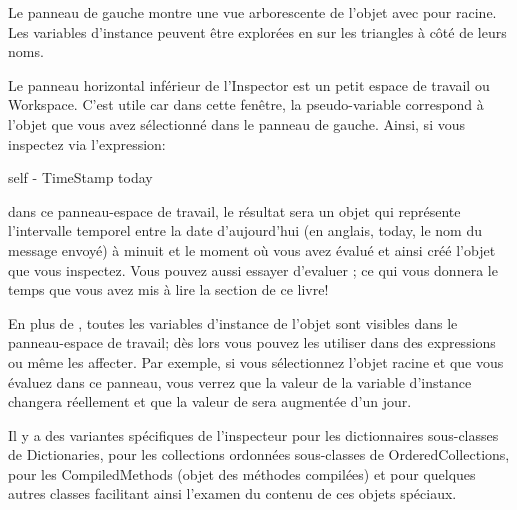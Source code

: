 \documentclass[a4paper,10pt,twoside]{book}
\begin{document}
Le panneau de gauche montre une vue arborescente de l'objet
avec \self{} pour racine. Les variables d'instance peuvent être
explorées en \clickant{} sur les triangles à côté de leurs noms.%


Le panneau horizontal inférieur de l'Inspector est un petit espace de
travail ou Workspace.
C'est utile car dans cette fenêtre, la pseudo-variable 
correspond à l'objet que vous avez sélectionné dans le panneau de gauche. 
Ainsi, si vous inspectez via  l'expression:
\begin{code}{}
self - TimeStamp today
\end{code}
dans ce panneau-espace de travail, le résultat sera un objet 
 qui représente l'intervalle temporel entre 
la date d'aujourd'hui (en anglais, today, le nom du message envoyé) à
minuit et le moment où vous avez évalué 
et ainsi créé l'objet  que vous inspectez.
Vous pouvez aussi essayer d'evaluer ; 
ce qui vous donnera le temps que vous avez mis à lire la section de ce livre!

En plus de , toutes les variables d'instance de l'objet sont
visibles dans le panneau-espace de travail; dès lors vous pouvez
les utiliser dans des expressions ou même les affecter.
Par exemple, si vous sélectionnez l'objet racine et que vous
évaluez  dans ce panneau,
vous verrez que la valeur de la variable d'instance  
changera réellement et que la valeur de  
sera augmentée d'un jour.


Il y a des variantes spécifiques de l'inspecteur pour les dictionnaires sous-classes 
de Dictionaries, pour les collections ordonnées sous-classes de OrderedCollections, 
pour les CompiledMethods (objet des méthodes compilées) et pour quelques autres classes 
facilitant ainsi l'examen du contenu de ces objets spéciaux.
\end{document}
